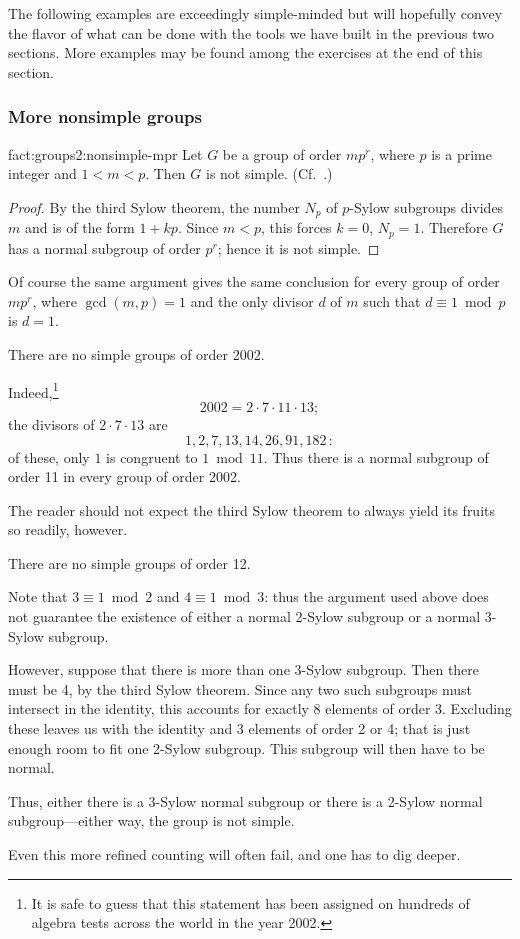 The following examples are exceedingly simple-minded but will
hopefully convey the flavor of what can be done with the tools we have
built in the previous two sections. More examples may be found among
the exercises at the end of this section.
\subsubsection*{More nonsimple groups}

\begin{fact}{}{fact:groups2:nonsimple-mpr}
  Let $G$ be a group of order $mp^r$, where $p$ is a prime integer and
  $1 < m < p$. Then $G$ is not simple. (Cf.\
  .)
\end{fact}
\begin{proof}
  By the third Sylow theorem, the number $N_p$ of $p$-Sylow subgroups
  divides $m$ and is of the form $1 + kp$. Since $m < p$, this forces
  $k = 0$, $N_p = 1$. Therefore $G$ has a normal subgroup of order
  $p^r$; hence it is not simple.
\end{proof}
Of course the same argument gives the same conclusion for every group
of order $mp^r$, where $\gcd(m, p) = 1$ and the only divisor $d$ of $m$
such that $d \equiv 1 \bmod p$ is $d = 1$.
\begin{exam}{}{}
  There are no simple groups of order 2002.

  Indeed,\footnote{It is safe to guess that this statement has been
    assigned on hundreds of algebra tests across the world in the year
    2002.}
  \[
    2002 = 2 \cdot 7 \cdot 11 \cdot 13;
  \]
  the divisors of $2 \cdot 7 \cdot 13$ are
  \[
    1, 2, 7, 13, 14, 26, 91, 182\,:
  \]
  of these, only $1$ is congruent to $1 \bmod 11$. Thus there is a
  normal subgroup of order 11 in every group of order 2002.
\end{exam}
The reader should not expect the third Sylow theorem to always yield
its fruits so readily, however.
\begin{exam}{}{}
  There are no simple groups of order 12.

  Note that $3 \equiv 1 \bmod 2$ and $4 \equiv 1 \bmod 3$: thus the
  argument used above does not guarantee the existence of either a
  normal 2-Sylow subgroup or a normal 3-Sylow subgroup.

  However, suppose that there is more than one 3-Sylow subgroup. Then
  there must be 4, by the third Sylow theorem. Since any two such
  subgroups must intersect in the identity, this accounts for exactly
  8 elements of order 3.  Excluding these leaves us with the identity
  and 3 elements of order 2 or 4; that is just enough room to fit one
  2-Sylow subgroup. This subgroup will then have to be normal.

  Thus, either there is a 3-Sylow normal subgroup or there is a
  2-Sylow normal subgroup---either way, the group is not simple.
\end{exam}
Even this more refined counting will often fail, and one has to dig
deeper.

